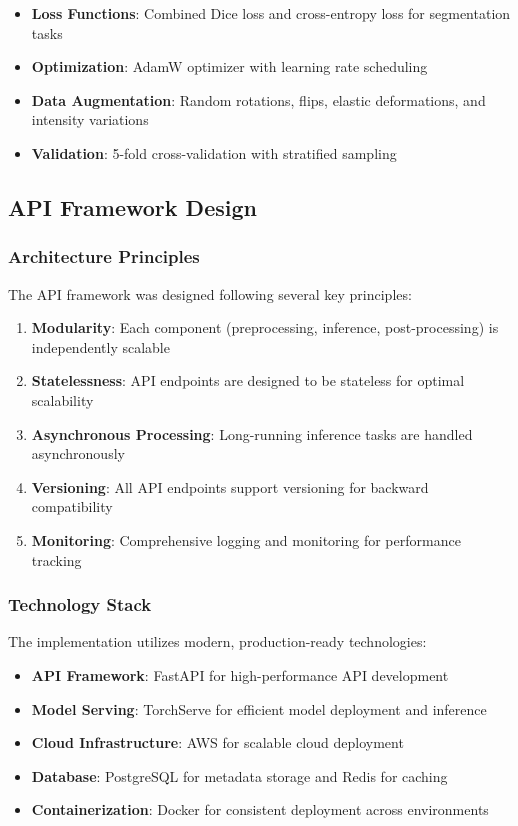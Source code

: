 \documentclass[12pt,a4paper]{article}
\begin{document}
\begin{itemize}
    \item \textbf{Loss Functions}: Combined Dice loss and cross-entropy loss for segmentation tasks
    \item \textbf{Optimization}: AdamW optimizer with learning rate scheduling
    \item \textbf{Data Augmentation}: Random rotations, flips, elastic deformations, and intensity variations
    \item \textbf{Validation}: 5-fold cross-validation with stratified sampling
\end{itemize}

\subsection{API Framework Design}

\subsubsection{Architecture Principles}

The API framework was designed following several key principles:

\begin{enumerate}
    \item \textbf{Modularity}: Each component (preprocessing, inference, post-processing) is independently scalable
    \item \textbf{Statelessness}: API endpoints are designed to be stateless for optimal scalability
    \item \textbf{Asynchronous Processing}: Long-running inference tasks are handled asynchronously
    \item \textbf{Versioning}: All API endpoints support versioning for backward compatibility
    \item \textbf{Monitoring}: Comprehensive logging and monitoring for performance tracking
\end{enumerate}

\subsubsection{Technology Stack}

The implementation utilizes modern, production-ready technologies:

\begin{itemize}
    \item \textbf{API Framework}: FastAPI for high-performance API development
    \item \textbf{Model Serving}: TorchServe for efficient model deployment and inference
    \item \textbf{Cloud Infrastructure}: AWS for scalable cloud deployment
    \item \textbf{Database}: PostgreSQL for metadata storage and Redis for caching
    \item \textbf{Containerization}: Docker for consistent deployment across environments
\end{itemize}
\end{document}
